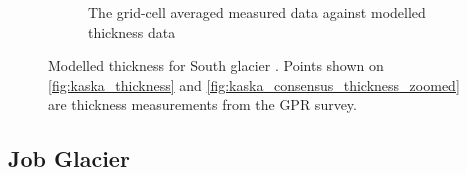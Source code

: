 \documentclass[a4, 12pt]{article}
\begin{document}
\begin{figure}[h!]
{\begin{subfigure}{0.65\textwidth}
\caption{The grid-cell averaged measured data against modelled thickness data}
\label{fig:xy_kaska_thickness}
\end{subfigure}
}
\caption{Modelled thickness for South glacier \citep{farinotti2019consensus}. Points shown on \ref{fig:kaska_thickness} and \ref{fig:kaska_consensus_thickness_zoomed} are thickness measurements from the GPR survey.}
\end{figure}
\FloatBarrier

\subsection{Job Glacier}
\end{document}
